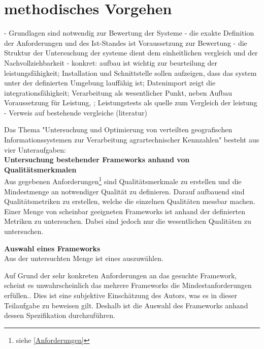 \chapter{methodisches Vorgehen}

- Grundlagen sind notwendig zur Bewertung der Systeme
- die exakte Definition der Anforderungen und des Ist-Standes ist Voraussetzung zur Bewertung
- die Struktur der Untersuchung der systeme dient dem einheitlichen vergleich und der Nachvollziehbarkeit
- konkret: aufbau ist wichtig  zur beurteilung der leistungsfähigkeit; Installation und Schnittstelle sollen aufzeigen, dass das system unter der definierten Umgebung lauffähig ist; Datenimport zeigt die integrationsfähigkeit; Verarbeitung als wesentlicher Punkt, neben Aufbau Voraussetzung für Leistung, ; Leistungstests als quelle zum Vergleich der leistung
- Verweis auf bestehende vergleiche (literatur)


Das Thema "Untersuchung und Optimierung von verteilten geografischen Informationssystemen zur Verarbeitung agrartechnischer Kennzahlen" besteht aus vier Unteraufgaben:\\
\textbf{Untersuchung bestehender Frameworks anhand von Qualitätsmerkmalen}\\
Aus gegebenen Anforderungen\footnote{siehe \ref{Anforderungen}} sind Qualitätsmerkmale zu erstellen und die Mindestmenge an notwendiger Qualität zu definieren.
Darauf aufbauend sind Qualitätsmetriken zu erstellen, welche die einzelnen Qualitäten messbar machen.
Einer Menge von scheinbar geeigneten Frameworks ist anhand der definierten Metriken zu untersuchen.
Dabei sind jedoch nur die wesentlichen Qualitäten zu untersuchen.


\textbf{Auswahl eines Frameworks}\\
Aus der untersuchten Menge ist eines auszuwählen.

Auf Grund der sehr konkreten Anforderungen an das gesuchte Framework, scheint es unwahrscheinlich das mehrere Frameworks die Mindestanforderungen erfüllen..
Dies ist eine subjektive Einschätzung des Autors, was es in dieser Teilaufgabe zu beweisen gilt.
Deshalb ist die Auswahl des Frameworks anhand dessen Spezifikation durchzuführen. %

